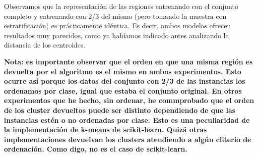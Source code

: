 \documentclass[11pt]{article}
\begin{document}
    \begin{center}
    \end{center}
    { \hspace*{\fill} \\}
    
    \begin{center}
    \end{center}
    { \hspace*{\fill} \\}
    
    \begin{center}
    \end{center}
    { \hspace*{\fill} \\}
    
    \begin{center}
    \end{center}
    { \hspace*{\fill} \\}
    
    \begin{center}
    \end{center}
    { \hspace*{\fill} \\}
    
    Observamos que la representación de las regiones entrenando con el
conjunto completo y entrenando con 2/3 del mismo (pero tomando la
muestra con estratificación) es prácticamente idéntica. Es decir, ambos
modelos ofrecen resultados muy parecidos, como ya habíamos indicado
antes analizando la distancia de los centroides.

\textbf{Nota: es importante observar que el orden en que una misma
región es devuelta por el algoritmo es el mismo en ambos experimentos.
Esto ocurre así porque los datos del conjunto con 2/3 de las instancias
los ordenamos por clase, igual que estaba el conjunto original. En otros
experimentos que he hecho, sin ordenar, he commprobado que el orden de
los cluster devueltos puede ser distinto dependiendo de que las
instancias estén o no ordenadas por clase. Esto es una peculiaridad de
la implementación de k-means de scikit-learn. Quizá otras
implementaciones devuelvan los clusters atendiendo a algún cliterio de
ordenación. Como digo, no es el caso de scikit-learn.}
\end{document}
